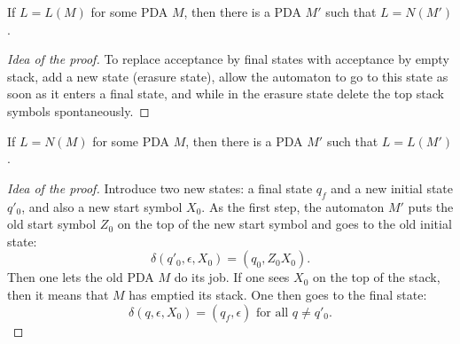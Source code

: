 \begin{page}
\setcounter{section}{6}
\setcounter{subsection}{3}
\setcounter{dfn}{8}
\label{portion:1134}

\begin{thm}
If $L = L(M)$ for some PDA $M$, then there is a PDA $M'$ such that $L = N(M')$.
\end{thm}

\end{page}

\begin{page}
\setcounter{section}{6}
\setcounter{subsection}{3}
\setcounter{dfn}{8}
\label{portion:1135}

\begin{proof}[Idea of the proof]
To replace acceptance by final states with acceptance by empty stack, add a new state (erasure state),
allow the automaton to go to this state as soon as it enters a final state,
and while in the erasure state delete the top stack symbols spontaneously.
\end{proof}


\end{page}

\begin{page}
\setcounter{section}{6}
\setcounter{subsection}{3}
\setcounter{dfn}{9}
\label{portion:1137}

\begin{thm}
If $L = N(M)$ for some PDA $M$, then there is a PDA $M'$ such that $L = L(M')$.
\end{thm}

\end{page}

\begin{page}
\setcounter{section}{6}
\setcounter{subsection}{4}
\setcounter{dfn}{9}
\label{portion:1138}

\begin{proof}[Idea of the proof]
Introduce two new states: a final state $q_f$ and a new initial state $q'_0$, and also a new start symbol $X_0$.
As the first step, the automaton $M'$ puts the old start symbol $Z_0$ on the top of the new start symbol and goes to the old initial state:
\[
\delta(q'_0, \epsilon, X_0) = (q_0, Z_0X_0).
\]
Then one lets the old PDA $M$ do its job.
If one sees $X_0$ on the top of the stack, then it means that $M$ has emptied its stack.
One then goes to the final state:
\[
\delta(q, \epsilon, X_0) = (q_f, \epsilon) \text{ for all }q \ne q'_0.
\]
\end{proof}



\end{page}


